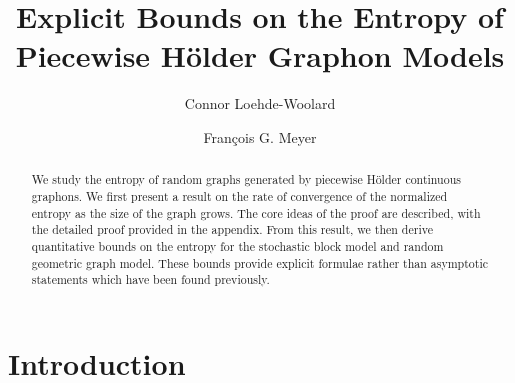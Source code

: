 \documentclass{svproc}
\newcommand{\1}{\mathbbm{1}}
\begin{document}
\mainmatter              %
%
\title{Explicit Bounds on the Entropy of Piecewise H\"{o}lder Graphon Models}
%
%
\author{Connor Loehde-Woolard \and Fran\c{c}ois G. Meyer}
%
%


\maketitle              %

\begin{abstract}
We study the entropy of random graphs generated by piecewise H\"{o}lder continuous graphons. We first present a result on the rate of convergence of the normalized entropy as the size of the graph grows. The core ideas of the proof are described, with the detailed proof provided in the appendix. From this result, we then derive quantitative bounds on the entropy for the stochastic block model and random geometric graph model. These bounds provide explicit formulae rather than asymptotic statements which have been found previously.

\end{abstract}
%

\section{Introduction}\label{sec1}
\end{document}
